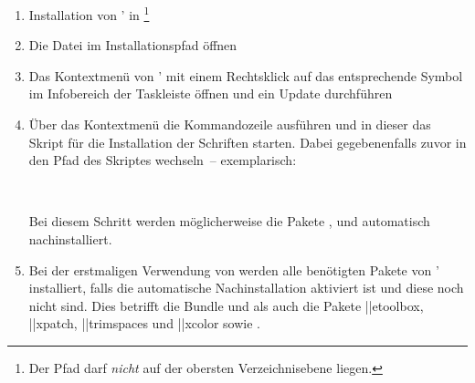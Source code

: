 %
\begin{enumerate}
\item Installation von \MiKTeX' in 
  \footnote{%
    Der Pfad darf \emph{nicht} auf der obersten Verzeichnisebene 
     liegen.
  }%
\item Die Datei  im Installationspfad öffnen
\item Das Kontextmenü von \MiKTeX' mit einem Rechtsklick auf das entsprechende 
  Symbol im Infobereich der Taskleiste öffnen und ein Update durchführen
\item Über das Kontextmenü die Kommandozeile ausführen und in dieser das Skript 
  für die Installation der Schriften  starten.
  Dabei gegebenenfalls zuvor in den Pfad des Skriptes wechseln~-- exemplarisch:
  \begin{quoting}[leftmargin=1.5em,rightmargin=0pt]
  \newline
  \,
  \end{quoting}
  Bei diesem Schritt werden möglicherweise die Pakete , 
   und  automatisch nachinstalliert.
\item Bei der erstmaligen Verwendung von \TUDScript werden alle benötigten 
  Pakete von \MiKTeX' installiert, falls die automatische Nachinstallation 
  aktiviert ist und diese noch nicht sind. Dies betrifft die Bundle 
   und  als auch die Pakete 
  \Package||{etoolbox}, \Package||{xpatch}, \Package||{trimspaces} und
  \Package||{xcolor} sowie .
\end{enumerate}
%
%
